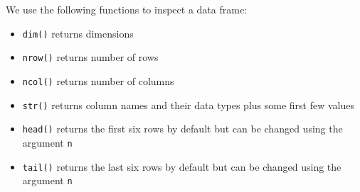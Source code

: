 \documentclass[
]{book}
\providecommand{\tightlist}{%
  \setlength{\itemsep}{0pt}\setlength{\parskip}{0pt}}
\begin{document}
We use the following functions to inspect a data frame:

\begin{itemize}
\tightlist
\item
  \texttt{dim()} returns dimensions
\item
  \texttt{nrow()} returns number of rows
\item
  \texttt{ncol()} returns number of columns
\item
  \texttt{str()} returns column names and their data types plus some first few values
\item
  \texttt{head()} returns the first six rows by default but can be changed using the argument \texttt{n}
\item
  \texttt{tail()} returns the last six rows by default but can be changed using the argument \texttt{n}
\end{itemize}
\end{document}
